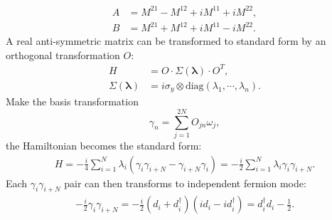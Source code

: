 \documentclass[aps,prb,superscriptaddress,nofootinbib]{revtex4}
\begin{document}
\begin{equation}
\begin{aligned}
	A &= M^{21} - M^{12} + i M^{11} + i M^{22}, \\
	B &= M^{21} + M^{12} + i M^{11} - i M^{22}.
	\label{eq:lattice-majorana-bilinear-to-fermion}
\end{aligned}
\end{equation}
A real anti-symmetric matrix can be transformed to standard form by an orthogonal transformation $O$:
\begin{equation}
\begin{aligned}
	H &= O \cdot \Sigma(\bm \lambda) \cdot O^T, \\
	\Sigma(\bm \lambda) &= i\sigma_y \otimes \mathrm{diag}(\lambda_1,\cdots,\lambda_n).
\end{aligned}
\end{equation}
Make the basis transformation
\begin{equation}
	\gamma_n = \sum_{j=1}^{2N} O_{jn} \omega_j,
\end{equation}
the Hamiltonian becomes the standard form:
\begin{equation}
\begin{aligned}
	H = -\frac{i}{4} \sum_{i=1}^N \lambda_i (\gamma_i \gamma_{i+N}-\gamma_{i+N} \gamma_i)
	= -\frac{i}{2} \sum_{i=1}^N \lambda_i \gamma_i \gamma_{i+N}.
\end{aligned}
\end{equation}
Each $\gamma_i \gamma_{i+N}$ pair can then transforms to independent fermion mode:
\begin{equation}
\begin{aligned}
	-\frac{i}{2}\gamma_i \gamma_{i+N} 
	= -\frac{i}{2}(d_i + d_i^\dagger)(id_i-id_i^\dagger)
	= d_i^\dagger d_i-\frac{1}{2}.
\end{aligned}
\end{equation}
\end{document}
